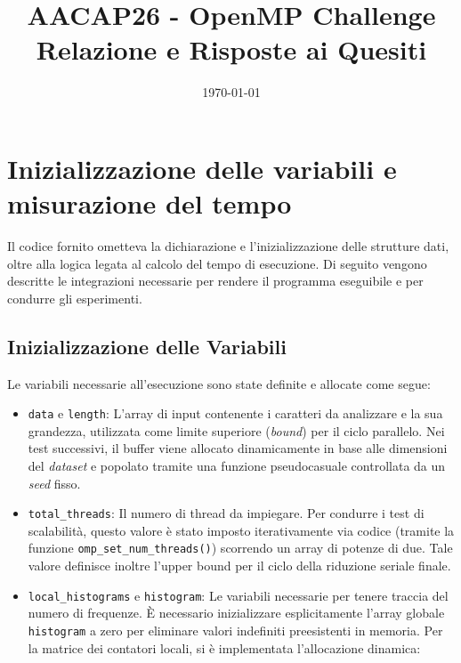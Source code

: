 \documentclass[a4paper,11pt]{article}
\begin{document}


\newpage 

\title{AACAP26 - OpenMP Challenge\\Relazione e Risposte ai Quesiti}
\author{}
\date{\today}
\maketitle

\section{Inizializzazione delle variabili e misurazione del tempo}

Il codice fornito ometteva la dichiarazione e l'inizializzazione delle strutture dati, oltre alla logica legata al calcolo del tempo di esecuzione. Di seguito vengono descritte le integrazioni necessarie per rendere il programma eseguibile e per condurre gli esperimenti.

\subsection{Inizializzazione delle Variabili}

Le variabili necessarie all'esecuzione sono state definite e allocate come segue:

\begin{itemize}
    \item \texttt{data} e \texttt{length}: L'array di input contenente i caratteri da analizzare e la sua grandezza, utilizzata come limite superiore (\textit{bound}) per il ciclo parallelo. Nei test successivi, il buffer viene allocato dinamicamente in base alle dimensioni del \textit{dataset} e popolato tramite una funzione pseudocasuale controllata da un \textit{seed} fisso.
   \item \texttt{total\_threads}: Il numero di thread da impiegare. Per condurre i test di scalabilità, questo valore è stato imposto iterativamente via codice (tramite la funzione \texttt{omp\_set\_num\allowbreak\_threads()}) scorrendo un array di potenze di due. Tale valore definisce inoltre l'upper bound per il ciclo della riduzione seriale finale.
    \item \texttt{local\_histograms} e \texttt{histogram}: Le variabili necessarie per tenere traccia del numero di frequenze. È necessario inizializzare esplicitamente l'array globale \texttt{histogram} a zero per eliminare valori indefiniti preesistenti in memoria. Per la matrice dei contatori locali, si è implementata l'allocazione dinamica:
\end{itemize}
\end{document}
